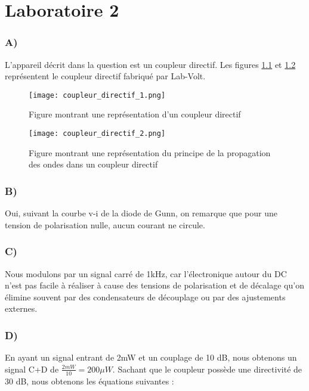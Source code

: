 



\label{s:experimentation}
\chapter{Laboratoire 2}
\subsection{A)}
L'appareil décrit dans la question est un coupleur directif. Les figures \ref{fig:coupleurdirectif1} et \ref{fig:coupleurdirectif2} représentent le coupleur directif fabriqué par Lab-Volt.
\begin{figure}
\centering
\texttt{[image: coupleur\_directif\_1.png]}
\caption{Figure montrant une représentation d'un coupleur directif}
\label{fig:coupleurdirectif1}
\end{figure}
\begin{figure}
\centering
\texttt{[image: coupleur\_directif\_2.png]}
\caption{Figure montrant une représentation du principe de la propagation des ondes dans un coupleur directif}
\label{fig:coupleurdirectif2}
\end{figure}

\subsection{B)}
Oui, suivant la courbe v-i de la diode de Gunn, on remarque que pour une tension de polarisation nulle, aucun courant ne circule.

\subsection{C)}
Nous modulons par un signal carré de 1kHz, car l’électronique autour du DC n’est pas facile à réaliser à cause des tensions de polarisation et de décalage qu’on élimine souvent par des condensateurs de découplage ou par des ajustements externes.

\subsection{D)}
En ayant un signal entrant de 2mW et un couplage de 10 dB, nous obtenons un signal C+D de $\frac{2mW}{10} = 200\mu W$. Sachant que le coupleur possède une directivité de 30 dB, nous obtenons les équations suivantes : 


